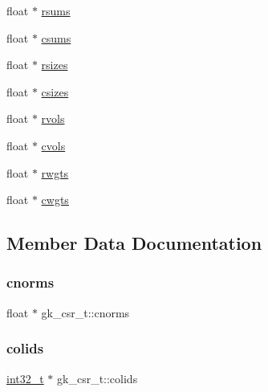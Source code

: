 \begin{DoxyCompactItemize}
\item 
float $\ast$ \hyperlink{structgk__csr__t_a6b19f0b4ae40c82ad60c7aa7666c6f4f}{rsums}
\item 
float $\ast$ \hyperlink{structgk__csr__t_a1b0bba1c502d83f2f693e0a239d3a349}{csums}
\item 
float $\ast$ \hyperlink{structgk__csr__t_aecea9e455b69114d1fcc883c6d228fb5}{rsizes}
\item 
float $\ast$ \hyperlink{structgk__csr__t_a1a3796f542789f042e03ed616a46de29}{csizes}
\item 
float $\ast$ \hyperlink{structgk__csr__t_a3cfbae243c346d2461e52e6985304bbb}{rvols}
\item 
float $\ast$ \hyperlink{structgk__csr__t_a3a9a8867c6f9a58169338d38befd4deb}{cvols}
\item 
float $\ast$ \hyperlink{structgk__csr__t_a1cdf3e25a63376b7feb3c96834f298d6}{rwgts}
\item 
float $\ast$ \hyperlink{structgk__csr__t_ac3a78774ad43e7a6c3e31e87a4f10e9a}{cwgts}
\end{DoxyCompactItemize}


\subsection{Member Data Documentation}
\mbox{\label{structgk__csr__t_a7fce0eac524c7f5c889b6c44a3ee41fb}} 
\subsubsection{\texorpdfstring{cnorms}{cnorms}}
{\footnotesize\ttfamily float $\ast$ gk\+\_\+csr\+\_\+t\+::cnorms}

\mbox{\label{structgk__csr__t_ad03b1a0a39247c0de8d2746b8f9b9c51}} 
\subsubsection{\texorpdfstring{colids}{colids}}
{\footnotesize\ttfamily \hyperlink{ms__stdint_8h_a37994e3b11c72957c6f454c6ec96d43d}{int32\+\_\+t} $\ast$ gk\+\_\+csr\+\_\+t\+::colids}

\mbox{\label{structgk__csr__t_a7ec1d81e61053234c9d42fb6913d0e9f}} 
